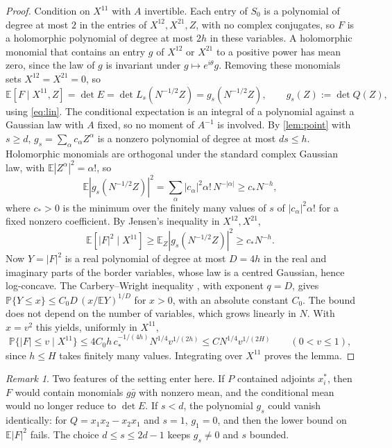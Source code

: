 \documentclass[11pt]{article}
\theoremstyle{remark}
\newtheorem{remark}[theorem]{Remark}
\newcommand{\E}{\mathbb E}
\newcommand{\Prob}{\mathbb P}
\begin{document}
\begin{proof}
Condition on $X^{11}$ with $A$ invertible. Each entry of $S_0$ is a polynomial of degree at most $2$ in the entries of $X^{12},X^{21},Z$, with no complex conjugates, so $F$ is a holomorphic polynomial of degree at most $2h$ in these variables. A holomorphic monomial that contains an entry $g$ of $X^{12}$ or $X^{21}$ to a positive power has mean zero, since the law of $g$ is invariant under $g\mapsto e^{i\theta}g$. Removing these monomials sets $X^{12}=X^{21}=0$, so
\[
\E[F\mid X^{11},Z]=\det E=\det L_s(N^{-1/2}Z)=g_s(N^{-1/2}Z),\qquad g_s(Z):=\det Q(Z),
\]
using \eqref{eq:lin}. The conditional expectation is an integral of a polynomial against a Gaussian law with $A$ fixed, so no moment of $A^{-1}$ is involved. By \cref{lem:point} with $s\ge d$, $g_s=\sum_\alpha c_\alpha Z^\alpha$ is a nonzero polynomial of degree at most $ds\le h$. Holomorphic monomials are orthogonal under the standard complex Gaussian law, with $\E|Z^\alpha|^2=\alpha!$, so
\[
\E|g_s(N^{-1/2}Z)|^2=\sum_\alpha|c_\alpha|^2\alpha!\,N^{-|\alpha|}\ge c_*N^{-h},
\]
where $c_*>0$ is the minimum over the finitely many values of $s$ of $|c_\alpha|^2\alpha!$ for a fixed nonzero coefficient. By Jensen's inequality in $X^{12},X^{21}$,
\[
\E[|F|^2\mid X^{11}]\ge\E_Z|g_s(N^{-1/2}Z)|^2\ge c_*N^{-h}.
\]
Now $Y=|F|^2$ is a real polynomial of degree at most $D=4h$ in the real and imaginary parts of the border variables, whose law is a centred Gaussian, hence log-concave. The Carbery--Wright inequality \cite[Theorem~8]{CW}, with exponent $q=D$, gives $\Prob\{Y\le x\}\le C_0D\,(x/\E Y)^{1/D}$ for $x>0$, with an absolute constant $C_0$. The bound does not depend on the number of variables, which grows linearly in $N$. With $x=v^2$ this yields, uniformly in $X^{11}$,
\[
\Prob\{|F|\le v\mid X^{11}\}\le 4C_0h\,c_*^{-1/(4h)}N^{1/4}v^{1/(2h)}\le CN^{1/4}v^{1/(2H)}\qquad(0<v\le1),
\]
since $h\le H$ takes finitely many values. Integrating over $X^{11}$ proves the lemma.
\end{proof}

\begin{remark}\label{rem:adjoints}
Two features of the setting enter here. If $P$ contained adjoints $x_i^*$, then $F$ would contain monomials $g\bar g$ with nonzero mean, and the conditional mean would no longer reduce to $\det E$. If $s<d$, the polynomial $g_s$ could vanish identically: for $Q=x_1x_2-x_2x_1$ and $s=1$, $g_1=0$, and then the lower bound on $\E|F|^2$ fails. The choice $d\le s\le2d-1$ keeps $g_s\ne0$ and $s$ bounded.
\end{remark}
\end{document}

